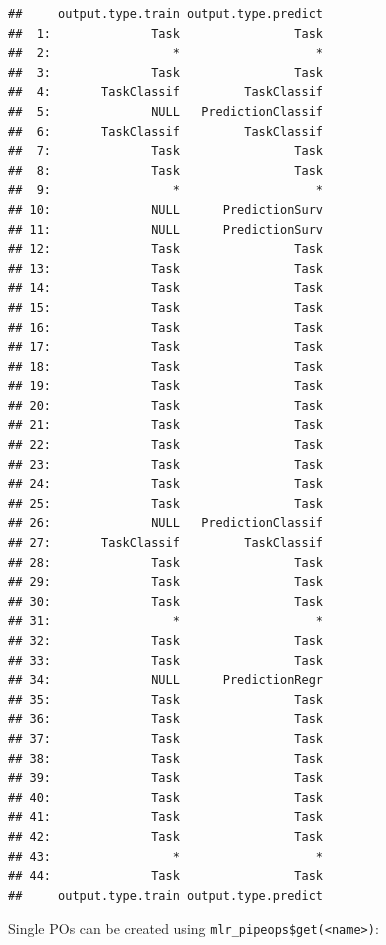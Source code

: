 \documentclass[]{article}
\newenvironment{Shaded}{\begin{snugshade}}{\end{snugshade}}
\newcommand{\KeywordTok}[1]{\textcolor[rgb]{0.13,0.29,0.53}{\textbf{#1}}}
\newcommand{\NormalTok}[1]{#1}
\newcommand{\OperatorTok}[1]{\textcolor[rgb]{0.81,0.36,0.00}{\textbf{#1}}}
\newcommand{\StringTok}[1]{\textcolor[rgb]{0.31,0.60,0.02}{#1}}
\renewenvironment{Shaded} {\begin{snugshade}\small} {\end{snugshade}}
\begin{document}
\begin{verbatim}
##     output.type.train output.type.predict
##  1:              Task                Task
##  2:                 *                   *
##  3:              Task                Task
##  4:       TaskClassif         TaskClassif
##  5:              NULL   PredictionClassif
##  6:       TaskClassif         TaskClassif
##  7:              Task                Task
##  8:              Task                Task
##  9:                 *                   *
## 10:              NULL      PredictionSurv
## 11:              NULL      PredictionSurv
## 12:              Task                Task
## 13:              Task                Task
## 14:              Task                Task
## 15:              Task                Task
## 16:              Task                Task
## 17:              Task                Task
## 18:              Task                Task
## 19:              Task                Task
## 20:              Task                Task
## 21:              Task                Task
## 22:              Task                Task
## 23:              Task                Task
## 24:              Task                Task
## 25:              Task                Task
## 26:              NULL   PredictionClassif
## 27:       TaskClassif         TaskClassif
## 28:              Task                Task
## 29:              Task                Task
## 30:              Task                Task
## 31:                 *                   *
## 32:              Task                Task
## 33:              Task                Task
## 34:              NULL      PredictionRegr
## 35:              Task                Task
## 36:              Task                Task
## 37:              Task                Task
## 38:              Task                Task
## 39:              Task                Task
## 40:              Task                Task
## 41:              Task                Task
## 42:              Task                Task
## 43:                 *                   *
## 44:              Task                Task
##     output.type.train output.type.predict
\end{verbatim}

Single POs can be created using \texttt{mlr\_pipeops\$get(\textless{}name\textgreater{})}:

\begin{Shaded}
\end{Shaded}
\end{document}
